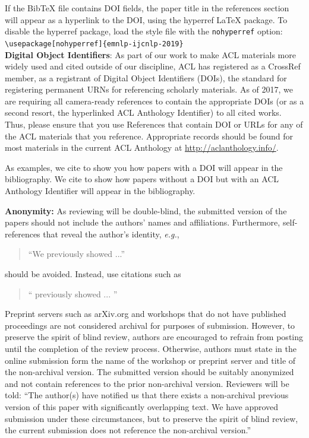 If the Bib\TeX{} file contains DOI fields, the paper title in the references section will appear as a hyperlink to the DOI, using the hyperref \LaTeX{} package. To disable the hyperref package, load the style file with the \verb|nohyperref| option: \\
{\small \verb|\usepackage[nohyperref]{emnlp-ijcnlp-2019}|}\\

\textbf{Digital Object Identifiers}: As part of our work to make ACL materials more widely used and cited outside of our discipline, ACL has registered as a CrossRef member, as a registrant of Digital Object Identifiers (DOIs), the standard for registering permanent URNs for referencing scholarly materials. As of 2017, we are requiring all camera-ready references to contain the appropriate DOIs (or as a second resort, the hyperlinked ACL Anthology Identifier) to all cited works. Thus, please ensure that you use References that contain DOI or URLs for any of the ACL materials that you reference. Appropriate records should be found for most materials in the current ACL Anthology at
\url{http://aclanthology.info/}.

As examples, we cite \cite{P16-1001} to show you how papers with a DOI will appear in the bibliography.  We cite \cite{C14-1001} to show how papers without a DOI but with an ACL Anthology Identifier will appear in the bibliography.  

\textbf{Anonymity:} As reviewing will be double-blind, the submitted version of the papers should not include the authors' names and affiliations. Furthermore, self-references that reveal the author's identity, {\em e.g.},

\begin{quote}
``We previously showed \cite{Gusfield:97} ...''  
\end{quote}

should be avoided. Instead, use citations such as

\begin{quote}
``\citeauthor{Gusfield:97} 
previously showed ... ''
\end{quote}

Preprint servers such as arXiv.org and workshops that do not have published proceedings are not considered archival for purposes of submission. However, to preserve the spirit of blind review, authors are encouraged to refrain from posting until the completion of the review process. Otherwise, authors must state in the online submission form the name of the workshop or preprint server and title of the non-archival version. The submitted version should be suitably anonymized and not contain references to the prior non-archival version. Reviewers will be told: ``The author(s) have notified us that there exists a non-archival previous version of this paper with significantly overlapping text. We have approved submission under these circumstances, but to preserve the spirit of blind review, the current submission does not reference the non-archival version.''

